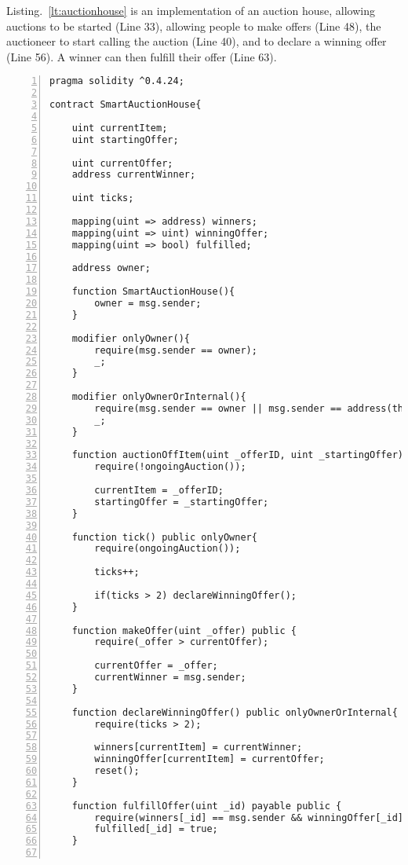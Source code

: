 \documentclass{article}
\begin{document}
 Listing.~\ref{lt:auctionhouse} is an implementation of an auction house, allowing auctions to be started (Line 33), allowing people to make offers (Line 48), the auctioneer to start calling the auction (Line 40), and to declare a winning offer (Line 56). A winner can then fulfill their offer (Line 63).
 
\small\begin{lstlisting}[language=DEA,basicstyle=\scriptsize,numbers=left,numbersep=2pt,xleftmargin=0.3cm,escapechar=\%,label={lt:auctionhouse}]
pragma solidity ^0.4.24;

contract SmartAuctionHouse{

    uint currentItem;
    uint startingOffer;

    uint currentOffer;
    address currentWinner;

    uint ticks;

    mapping(uint => address) winners;
    mapping(uint => uint) winningOffer;
    mapping(uint => bool) fulfilled;

    address owner;

    function SmartAuctionHouse(){
        owner = msg.sender;
    }

    modifier onlyOwner(){
        require(msg.sender == owner);
        _;
    }
    
    modifier onlyOwnerOrInternal(){
        require(msg.sender == owner || msg.sender == address(this));
        _;
    }

    function auctionOffItem(uint _offerID, uint _startingOffer) public {
        require(!ongoingAuction());

        currentItem = _offerID;
        startingOffer = _startingOffer;
    }

    function tick() public onlyOwner{
        require(ongoingAuction());

        ticks++;

        if(ticks > 2) declareWinningOffer();
    }

    function makeOffer(uint _offer) public {
        require(_offer > currentOffer);

        currentOffer = _offer;
        currentWinner = msg.sender;
    }

    function declareWinningOffer() public onlyOwnerOrInternal{
        require(ticks > 2);

        winners[currentItem] = currentWinner;
        winningOffer[currentItem] = currentOffer;
        reset();
    }

    function fulfillOffer(uint _id) payable public {
        require(winners[_id] == msg.sender && winningOffer[_id] == msg.value && !fulfilled[_id]);
        fulfilled[_id] = true;
    }


\end{lstlisting}
\end{document}
